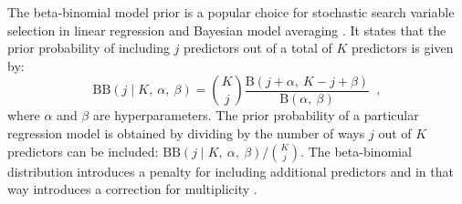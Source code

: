 \documentclass[11pt,a4paper]{article}
\theoremstyle{definition} %
\theoremstyle{case}
\newcommand{\FBeta}[2]{\text{B}\left({#1},\ {#2}\right)}
\newcommand{\BetaBinom}[4]{\text{BB}\left(#1 \mid #2 ,\ #3 ,\ #4 \right)}
\DeclareRobustCommand{\stirling}{\genfrac\{\}{0pt}{}}
\begin{document}
The beta-binomial model prior is a popular choice for stochastic search variable selection in linear regression \parencite[][]{george1993variable} and Bayesian model averaging \parencite[e.g.,][]{hinne2020conceptual, hoeting1999bayesian}. It states that the prior probability of including $j$ predictors out of a total of $K$ predictors is given by:
\begin{equation}
    \BetaBinom{j}{K}{\alpha}{\beta} = \binom{K}{j} \frac{\FBeta{j + \alpha}{K - j + \beta}}{\FBeta{\alpha}{\beta}} \enspace ,
\end{equation}
where $\alpha$ and $\beta$ are hyperparameters. The prior probability of a particular regression model is obtained by dividing by the number of ways $j$ out of $K$ predictors can be included: $\BetaBinom{j}{K}{\alpha}{\beta} / \binom{K}{j}$. The beta-binomial distribution introduces a penalty for including additional predictors and in that way introduces a correction for multiplicity \parencite{scott2006exploration, scott2010bayes}.

\end{document}
